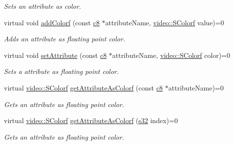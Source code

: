 \begin{DoxyCompactItemize}
\begin{DoxyCompactList}\small\item\em Sets an attribute as color. \end{DoxyCompactList}\item 
\mbox{\label{classirr_1_1io_1_1IAttributes_a3107a3b74356b6e456f5a0bdf855e510}} 
virtual void \hyperlink{classirr_1_1io_1_1IAttributes_a3107a3b74356b6e456f5a0bdf855e510}{add\+Colorf} (const \hyperlink{namespaceirr_a9395eaea339bcb546b319e9c96bf7410}{c8} $\ast$attribute\+Name, \hyperlink{classirr_1_1video_1_1SColorf}{video\+::\+S\+Colorf} value)=0
\begin{DoxyCompactList}\small\item\em Adds an attribute as floating point color. \end{DoxyCompactList}\item 
\mbox{\label{classirr_1_1io_1_1IAttributes_a360d6ab48ca8d2bfc727e0aeab34c44b}} 
virtual void \hyperlink{classirr_1_1io_1_1IAttributes_a360d6ab48ca8d2bfc727e0aeab34c44b}{set\+Attribute} (const \hyperlink{namespaceirr_a9395eaea339bcb546b319e9c96bf7410}{c8} $\ast$attribute\+Name, \hyperlink{classirr_1_1video_1_1SColorf}{video\+::\+S\+Colorf} color)=0
\begin{DoxyCompactList}\small\item\em Sets a attribute as floating point color. \end{DoxyCompactList}\item 
virtual \hyperlink{classirr_1_1video_1_1SColorf}{video\+::\+S\+Colorf} \hyperlink{classirr_1_1io_1_1IAttributes_ac072aeae816dd06e196eafb910511d2b}{get\+Attribute\+As\+Colorf} (const \hyperlink{namespaceirr_a9395eaea339bcb546b319e9c96bf7410}{c8} $\ast$attribute\+Name)=0
\begin{DoxyCompactList}\small\item\em Gets an attribute as floating point color. \end{DoxyCompactList}\item 
virtual \hyperlink{classirr_1_1video_1_1SColorf}{video\+::\+S\+Colorf} \hyperlink{classirr_1_1io_1_1IAttributes_a3400093bf32360c0b2916b94ad0bdbdd}{get\+Attribute\+As\+Colorf} (\hyperlink{namespaceirr_ac66849b7a6ed16e30ebede579f9b47c6}{s32} index)=0
\begin{DoxyCompactList}\small\item\em Gets an attribute as floating point color. \end{DoxyCompactList}\item 

\end{DoxyCompactItemize}
